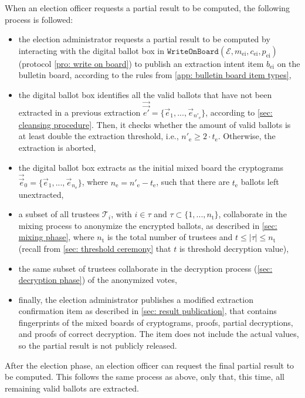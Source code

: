 When an election officer requests a partial result to be computed, the following process is followed:
\begin{itemize}
    \item the election administrator requests a partial result to be computed by interacting with the digital ballot box in $\mathtt{WriteOnBoard}(\mathcal{E}, m_\mathrm{ei}, c_\mathrm{ei}, p_\mathrm{ei})$ (protocol \ref{pro: write on board}) to publish an extraction intent item $b_\mathrm{ei}$ on the bulletin board, according to the rules from \cref{app: bulletin board item types},
    \item the digital ballot box identifies all the valid ballots that have not been extracted in a previous extraction $\vec{\vec{e'}} = \{ \vec{e}_1, ..., \vec{e}_{n'_\mathrm{e}} \}$, according to \cref{sec: cleansing procedure}. Then, it checks whether the amount of valid ballots is at least double the extraction threshold, i.e., $n'_\mathrm{e} \geq 2 \cdot t_\mathrm{e}$. Otherwise, the extraction is aborted,
    \item the digital ballot box extracts as the initial mixed board the cryptograms $\vec{\vec{e}}_0 = \{ \vec{e}_1, ..., \vec{e}_{n_\mathrm{e}} \}$, where $n_\mathrm{e} = n'_\mathrm{e} - t_\mathrm{e}$, such that there are $t_\mathrm{e}$ ballots left unextracted,
    \item a subset of all trustees $\mathcal{T}_i$, with $i \in \tau$ and $\tau \subset \{ 1, ..., n_\mathrm{t} \}$, collaborate in the mixing process to anonymize the encrypted ballots, as described in \cref{sec: mixing phase}, where $n_\mathrm{t}$ is the total number of trustees and $t \leq |\tau| \leq n_\mathrm{t}$ (recall from \cref{sec: threshold ceremony} that $t$ is threshold decryption value),
    \item the same subset of trustees collaborate in the decryption process (\cref{sec: decryption phase}) of the anonymized votes,
    \item finally, the election administrator publishes a modified extraction confirmation item as described in \cref{sec: result publication}, that contains fingerprints of the mixed boards of cryptograms, proofs, partial decryptions, and proofs of correct decryption. The item does not include the actual values, so the partial result is not publicly released.
\end{itemize}

After the election phase, an election officer can request the final partial result to be computed. This follows the same process as above, only that, this time, all remaining valid ballots are extracted.


